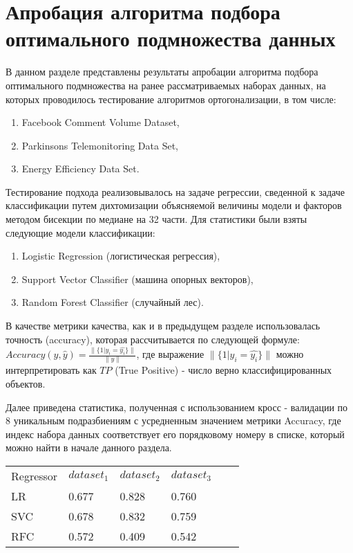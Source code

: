 \documentclass[runningheads]{llncs}
\begin{document}
\section*{Апробация алгоритма подбора оптимального подмножества данных}
\hspace{0.4cm}
В данном разделе представлены результаты апробации алгоритма подбора оптимального подмножества на ранее рассматриваемых наборах данных, на которых проводилось тестирование алгоритмов ортогонализации, в том числе:
\begin{enumerate}
  \item Facebook Comment Volume Dataset, 
  \item Parkinsons Telemonitoring Data Set,
  \item Energy Efficiency Data Set.
\end{enumerate}
Тестирование подхода реализовывалось на задаче регрессии, сведенной к задаче классификации путем дихтомизации объясняемой величины модели и факторов методом бисекции по медиане на 32 части.
Для статистики были взяты следующие модели классификации: \par
\begin{enumerate}
  \item Logistic Regression (логистическая регрессия), 
  \item Support Vector Classifier (машина опорных векторов),
  \item Random Forest Classifier (случайный лес).
\end{enumerate}
В качестве метрики качества, как и в предыдущем разделе использовалась точность (accuracy), которая рассчитывается по следующей формуле: $Accuracy(y, \hat{y}) = \frac{\|\{1 | y_i = \hat{y_i}\}\|}{\|y\|}$, где выражение $\|\{1 | y_i = \hat{y_i}\}\|$ можно интерпретировать как $TP$ (True Positive) - число верно классифицированных объектов. \par
Далее приведена статистика, полученная с использованием кросс - валидации по 8 уникальным подразбиениям с усредненным значением метрики Accuracy, где индекс набора данных соответствует его порядковому номеру в списке, который можно найти в начале данного раздела. \par
\begin{table}[H]
\begin{tabular}{llllll}
Regressor & $dataset_1$ & $dataset_2$ & $dataset_3$ \\
LR    & 0.677 & 0.828 & 0.760 \\
SVC   & 0.678 & 0.832 & 0.759 \\
RFC   & 0.572 & 0.409 & 0.542
\end{tabular}
\end{table}
\end{document}

